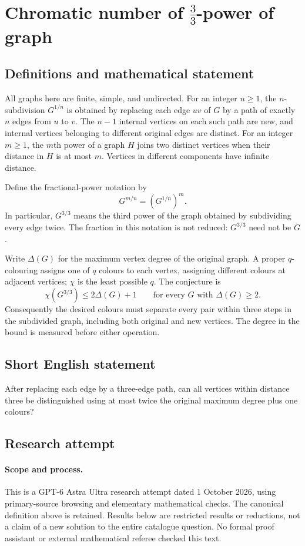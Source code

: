 \documentclass[11pt,a4paper]{article}
\begin{document}
\section*{Chromatic number of $\frac{3}{3}$-power of graph}\label{statement}

\subsection{Definitions and mathematical statement}
All graphs here are finite, simple, and undirected. For an integer
$n\geq1$, the $n$-subdivision $G^{1/n}$ is obtained by replacing
each edge $uv$ of $G$ by a path of exactly $n$ edges from $u$ to
$v$. The $n-1$ internal vertices on each such path are new, and
internal vertices belonging to different original edges are
distinct. For an integer $m\geq1$, the $m$th power of a graph $H$
joins two distinct vertices when their distance in $H$ is at most
$m$. Vertices in different components have infinite distance.

Define the fractional-power notation by
\[
 G^{m/n}=(G^{1/n})^m.
\]
In particular, $G^{3/3}$ means the third power of the graph obtained
by subdividing every edge twice. The fraction in this notation is
not reduced: $G^{3/3}$ need not be $G$.

Write $\Delta(G)$ for the maximum vertex degree of the original
graph. A proper $q$-colouring assigns one of $q$ colours to each
vertex, assigning different colours at adjacent vertices; $\chi$
is the least possible $q$. The conjecture is
\[
 \chi(G^{3/3})\leq2\Delta(G)+1
 \qquad\text{for every }G\text{ with }\Delta(G)\geq2.
\]
Consequently the desired colours must separate every pair within
three steps in the subdivided graph, including both original and
new vertices. The degree in the bound is measured before either
operation.
\subsection{Short English statement}
After replacing each edge by a three-edge path, can all vertices within distance three be distinguished using at most twice the original maximum degree plus one colours?
\subsection{Research attempt}
\paragraph{Scope and process.}
This is a GPT-6 Astra Ultra research attempt dated 1 October 2026, using
primary-source browsing and elementary mathematical checks. The canonical
definition above is retained. Results below are restricted results or
reductions, not a claim of a new solution to the entire catalogue question.
No formal proof assistant or external mathematical referee checked this text.
\end{document}
